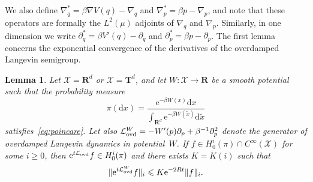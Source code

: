 \documentclass[11pt,a4paper]{article}
\newcommand{\e}{\mathrm{e}}
\newcommand{\real}{\mathbf R}
\newcommand{\torus}{\mathbf T}
\renewcommand{\d}{\mathrm d}
\theoremstyle{plain}
\newtheorem{lemma}{Lemma}[section]
\numberwithin{equation}{section}
\renewcommand{\leq}{\leqslant}
\renewcommand{\geq}{\geqslant}
\begin{document}
We also define $\nabla_q^* = \beta \nabla V(q) - \nabla_q$ and $\nabla_p^* = \beta p - \nabla_p$,
and note that these operators are formally the $L^2(\mu)$ adjoints of $\nabla_q$ and $\nabla_p$.
Similarly, in one dimension we write $\partial_q^* = \beta V'(q) - \partial_q$ and $\partial_p^* = \beta p - \partial_p$.
The first lemma concerns the exponential convergence of the derivatives of the overdamped Langevin semigroup.
\begin{lemma}
    \label{lemma:overdamped_langevin_decay_derivatives}
    Let $\mathcal X = \real^d$ or $\mathcal X = \torus^d$,
    and let $W: \mathcal X \to \real$ be a smooth potential such that the probability measure
    \[
        \pi(\d x) = \frac{\e^{- \beta W(x)} \d x}{\int_{\real^d} \e^{-\beta W(\widetilde x)} \d \widetilde x}
    \]
    satisfies~\eqref{eq:poincare}.
    Let also $\mathcal L_{\rm ovd}^W = - W'(p) \partial_p + \beta^{-1} \partial_p^2$ denote the generator of overdamped Langevin dynamics in potential~$W$.
    If $f \in H^i_0(\pi) \cap C^{\infty}(\mathcal X)$ for some $i \geq 0$,
    then $\e^{t \mathcal L_{\rm ovd}} f \in H^i_0(\pi)$ and there exists $K = K(i)$ such that
    \[
        \norm*{\e^{t \mathcal L_{\rm ovd}^W} f}_i \leq K \e^{- 2 R t} \norm*{f}_i.
    \]
\end{lemma}
\end{document}
